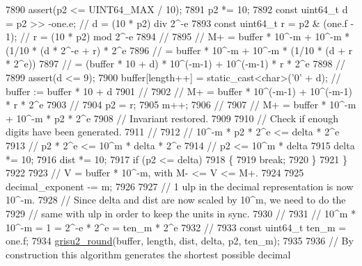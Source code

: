 \begin{DoxyCode}
7890         assert(p2 <= UINT64\_MAX / 10);
7891         p2 *= 10;
7892         \textcolor{keyword}{const} uint64\_t d = p2 >> -one.e;     \textcolor{comment}{// d = (10 * p2) div 2^-e}
7893         \textcolor{keyword}{const} uint64\_t r = p2 & (one.f - 1); \textcolor{comment}{// r = (10 * p2) mod 2^-e}
7894         \textcolor{comment}{//}
7895         \textcolor{comment}{//      M+ = buffer * 10^-m + 10^-m * (1/10 * (d * 2^-e + r) * 2^e}
7896         \textcolor{comment}{//         = buffer * 10^-m + 10^-m * (1/10 * (d + r * 2^e))}
7897         \textcolor{comment}{//         = (buffer * 10 + d) * 10^(-m-1) + 10^(-m-1) * r * 2^e}
7898         \textcolor{comment}{//}
7899         assert(d <= 9);
7900         buffer[length++] = \textcolor{keyword}{static\_cast<}\textcolor{keywordtype}{char}\textcolor{keyword}{>}(\textcolor{charliteral}{'0'} + d); \textcolor{comment}{// buffer := buffer * 10 + d}
7901         \textcolor{comment}{//}
7902         \textcolor{comment}{//      M+ = buffer * 10^(-m-1) + 10^(-m-1) * r * 2^e}
7903         \textcolor{comment}{//}
7904         p2 = r;
7905         m++;
7906         \textcolor{comment}{//}
7907         \textcolor{comment}{//      M+ = buffer * 10^-m + 10^-m * p2 * 2^e}
7908         \textcolor{comment}{// Invariant restored.}
7909 
7910         \textcolor{comment}{// Check if enough digits have been generated.}
7911         \textcolor{comment}{//}
7912         \textcolor{comment}{//      10^-m * p2 * 2^e <= delta * 2^e}
7913         \textcolor{comment}{//              p2 * 2^e <= 10^m * delta * 2^e}
7914         \textcolor{comment}{//                    p2 <= 10^m * delta}
7915         delta *= 10;
7916         dist  *= 10;
7917         \textcolor{keywordflow}{if} (p2 <= delta)
7918         \{
7919             \textcolor{keywordflow}{break};
7920         \}
7921     \}
7922 
7923     \textcolor{comment}{// V = buffer * 10^-m, with M- <= V <= M+.}
7924 
7925     decimal\_exponent -= m;
7926 
7927     \textcolor{comment}{// 1 ulp in the decimal representation is now 10^-m.}
7928     \textcolor{comment}{// Since delta and dist are now scaled by 10^m, we need to do the}
7929     \textcolor{comment}{// same with ulp in order to keep the units in sync.}
7930     \textcolor{comment}{//}
7931     \textcolor{comment}{//      10^m * 10^-m = 1 = 2^-e * 2^e = ten\_m * 2^e}
7932     \textcolor{comment}{//}
7933     \textcolor{keyword}{const} uint64\_t ten\_m = one.f;
7934     \hyperlink{namespacenlohmann_1_1detail_1_1dtoa__impl_a9e66e6d0f072aa4fc0627bffc5b1cbd8}{grisu2\_round}(buffer, length, dist, delta, p2, ten\_m);
7935 
7936     \textcolor{comment}{// By construction this algorithm generates the shortest possible decimal}

\end{DoxyCode}

